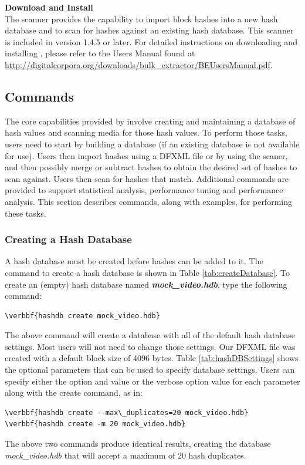 \documentclass[11pt,fleqn]{article} %
\begin{document}
\textbf{Download and Install \bulk}\\
The \bulk \hash scanner provides the capability to import block hashes into a new hash database and to scan for hashes against an existing hash database.
This scanner is included in \bulk version 1.4.5 or later. For detailed instructions on downloading and installing \bulk, please refer to the Users Manual found at \url{http://digitalcorpora.org/downloads/bulk_extractor/BEUsersManual.pdf}.

\subsection {\hash Commands}
\label{Running}
The core capabilities provided by \hash involve creating and maintaining a database of hash values and scanning media for those hash values. To perform those tasks, \hash users need to start by building a database (if an existing database is not available for use).
Users then import hashes using a DFXML file or by using the \bulk \hash scaner, and then possibly merge or subtract hashes to obtain the desired set of hashes to scan against.
Users then scan for hashes that match.
Additional commands are provided to support statistical analysis, performance tuning and performance analysis.
This section describes \hash commands, along with examples, for performing these tasks.

\subsubsection{Creating a Hash Database}
A hash database must be created before hashes can be added to it.
The command to create a hash database is shown in Table \ref{tab:createDatabase}.
To create an (empty) hash database named \textbf{\textit{mock\_video.hdb}}, type the following command:
\begin{Verbatim}[commandchars=\\\{\}]
\verbbf{hashdb create mock_video.hdb}
\end{Verbatim}
The above command will create a database with all of the default hash database settings. Most users will not need to change those settings. Our DFXML file was created with a default block size of 4096 bytes. Table \ref{tab:hashDBSettings} shows the optional parameters that can be used to specify database settings. Users can specify either the option and value or the verbose option value for each parameter along with the create command, as in:\\
\begin{Verbatim}[commandchars=\\\{\}]
\verbbf{hashdb create --max\_duplicates=20 mock_video.hdb}
\verbbf{hashdb create -m 20 mock_video.hdb}
\end{Verbatim}
The above two commands produce identical results, creating the database \textit{mock\_video.hdb} that will accept a maximum of 20 hash duplicates.\\
\end{document}
